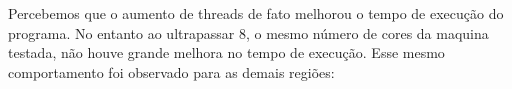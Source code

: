 \documentclass[12pt]{article}
\begin{document}
Percebemos que o aumento de threads de fato melhorou o tempo de execução do programa. No entanto ao ultrapassar 8, o mesmo número de cores da maquina testada, não houve grande melhora no tempo de execução. Esse mesmo comportamento foi observado para as demais regiões:

\begin{figure}[H]
\end{figure}

\begin{figure}[H]
\end{figure}

\begin{figure}[H]
\end{figure}
\end{document}

